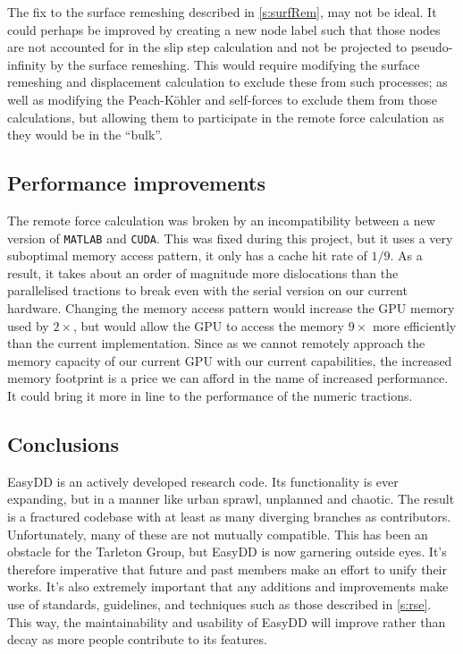 The fix to the surface remeshing described in \cref{s:surfRem}, may not be ideal. It could perhaps be improved by creating a new node label such that those nodes are not accounted for in the slip step calculation and not be projected to pseudo-infinity by the surface remeshing. This would require modifying the surface remeshing and displacement calculation to exclude these from such processes; as well as modifying the Peach-K\"{o}hler and self-forces to exclude them from those calculations, but allowing them to participate in the remote force calculation as they would be in the ``bulk''.

\subsection{Performance improvements}

The remote force calculation was broken by an incompatibility between a new version of \texttt{MATLAB} and \texttt{CUDA}. This was fixed during this project, but it uses a very suboptimal memory access pattern, it only has a cache hit rate of $1/9$. As a result, it takes about an order of magnitude more dislocations than the parallelised tractions to break even with the serial version on our current hardware. Changing the memory access pattern would increase the GPU memory used by $2\times$, but would allow the GPU to access the memory $9\times$ more efficiently than the current implementation. Since as we cannot remotely approach the memory capacity of our current GPU with our current capabilities, the increased memory footprint is a price we can afford in the name of increased performance. It could bring it more in line to the performance of the numeric tractions.

\subsection{Conclusions}

EasyDD is an actively developed research code. Its functionality is ever expanding, but in a manner like urban sprawl, unplanned and chaotic. The result is a fractured codebase with at least as many diverging branches as contributors. Unfortunately, many of these are not mutually compatible. This has been an obstacle for the Tarleton Group, but EasyDD is now garnering outside eyes. It's therefore imperative that future and past members make an effort to unify their works. It's also extremely important that any additions and improvements make use of standards, guidelines, and techniques such as those described in \cref{s:rse}. This way, the maintainability and usability of EasyDD will improve rather than decay as more people contribute to its features.
\savearabiccounter
